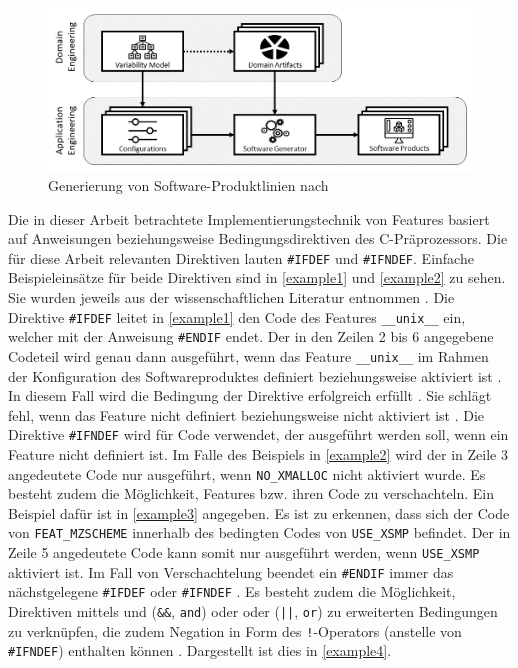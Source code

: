 \begin{figure}[ht]
    \centering
    \includegraphics[width=\textwidth]{images/SPL}
    \caption{Generierung von Software-Produktlinien nach \cite{Thuem2014}\label{fig:spl}}
\end{figure}

Die in dieser Arbeit betrachtete Implementierungstechnik von Features basiert auf Anweisungen beziehungsweise Bedingungsdirektiven des C-Präprozessors. Die für diese Arbeit relevanten Direktiven lauten \texttt{\#IFDEF} und \texttt{\#IFNDEF}. Einfache Beispieleinsätze für beide Direktiven sind in \autoref{example1} und \autoref{example2} zu sehen. Sie wurden jeweils aus der wissenschaftlichen Literatur entnommen \cite{Medeiros2018,Preschern2019}. Die Direktive \texttt{\#IFDEF} leitet in \autoref{example1} den Code des Features \texttt{\_\_unix\_\_} ein, welcher mit der Anweisung \texttt{\#ENDIF} endet. Der in den Zeilen 2 bis 6 angegebene Codeteil wird genau dann ausgeführt, wenn das Feature \texttt{\_\_unix\_\_} im Rahmen der Konfiguration des Softwareproduktes definiert beziehungsweise aktiviert ist \cite{Stallmann2016}. In diesem Fall wird die Bedingung der Direktive erfolgreich erfüllt \cite{Stallmann2016}. Sie schlägt fehl, wenn das Feature nicht definiert beziehungsweise nicht aktiviert ist \cite{Stallmann2016}. Die Direktive \texttt{\#IFNDEF} wird für Code verwendet, der ausgeführt werden soll, wenn ein Feature nicht definiert ist. Im Falle des Beispiels in \autoref{example2} wird der in Zeile 3 angedeutete Code nur ausgeführt, wenn \texttt{NO\_XMALLOC} nicht aktiviert wurde.
Es besteht zudem die Möglichkeit, Features bzw. ihren Code zu verschachteln. Ein Beispiel dafür ist in \autoref{example3} angegeben. Es ist zu erkennen, dass sich der Code von \texttt{FEAT\_MZSCHEME} innerhalb des bedingten Codes von \texttt{USE\_XSMP} befindet. Der in Zeile 5 angedeutete Code kann somit nur ausgeführt werden, wenn \texttt{USE\_XSMP} aktiviert ist. Im Fall von Verschachtelung beendet ein \texttt{\#ENDIF} immer das nächstgelegene \texttt{\#IFDEF} oder \texttt{\#IFNDEF} \cite{Stallmann2016}. Es besteht zudem die Möglichkeit, Direktiven mittels \glqq und\grqq{} (\texttt{\&\&}, \texttt{and}) oder \glqq oder\grqq{} (\texttt{||}, \texttt{or}) zu erweiterten Bedingungen zu verknüpfen, die zudem Negation in Form des \texttt{!}-Operators (anstelle von \texttt{\#IFNDEF}) enthalten können \cite{Stallmann2016,Queiroz2015}. Dargestellt ist dies in \autoref{example4}.

